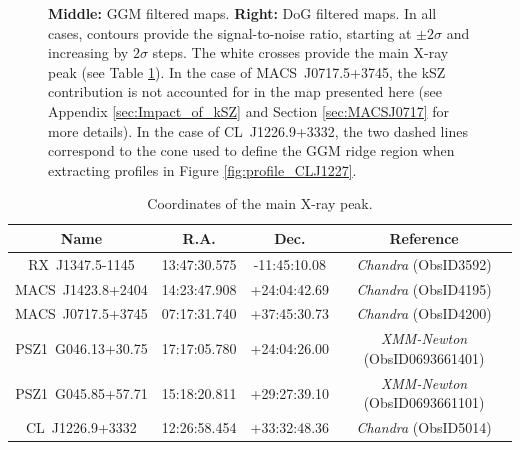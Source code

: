 \documentclass[twocolumn,traditabstract]{aa}
\begin{document}
\begin{figure}[p]
{{{\bf Middle:} GGM filtered maps.
{\bf Right:} DoG filtered maps.
In all cases, contours provide the signal-to-noise ratio, starting at $\pm 2 \sigma$ and increasing by $2 \sigma$ steps. The white crosses provide the main X-ray peak (see Table \ref{tab:xray_peak}). In the case of \mbox{MACS~J0717.5+3745}, the kSZ contribution is not accounted for in the map presented here (see Appendix \ref{sec:Impact_of_kSZ} and Section \ref{sec:MACSJ0717} for more details). In the case of \mbox{CL~J1226.9+3332}, the two dashed lines correspond to the cone used to define the GGM ridge region when extracting profiles in Figure \ref{fig:profile_CLJ1227}.}}
\label{fig:NIKA_cluster_sample}
\end{figure}

\begin{table}[]
\caption{\footnotesize{Coordinates of the main X-ray peak.}}
\begin{center}
\resizebox{0.5\textwidth}{!} {
\begin{tabular}{c|c|c|c}
\hline
\hline
Name & R.A. & Dec. & Reference \\
\hline
RX~J1347.5-1145 & 13:47:30.575 & -11:45:10.08 & \textit{Chandra} (ObsID3592) \\ 
MACS~J1423.8+2404 & 14:23:47.908 & +24:04:42.69 & \textit{Chandra} (ObsID4195) \\ 
MACS~J0717.5+3745 & 07:17:31.740 & +37:45:30.73 & \textit{Chandra} (ObsID4200) \\ 
PSZ1~G046.13+30.75 & 17:17:05.780 & +24:04:26.00 & \textit{XMM-Newton} (ObsID0693661401) \\ 
PSZ1~G045.85+57.71 & 15:18:20.811 & +29:27:39.10 & \textit{XMM-Newton} (ObsID0693661101) \\ 
CL~J1226.9+3332 & 12:26:58.454 & +33:32:48.36 & \textit{Chandra} (ObsID5014) \\ 
\hline
\end{tabular}
}
\end{center}
\label{tab:xray_peak}
\end{table}
\end{document}
